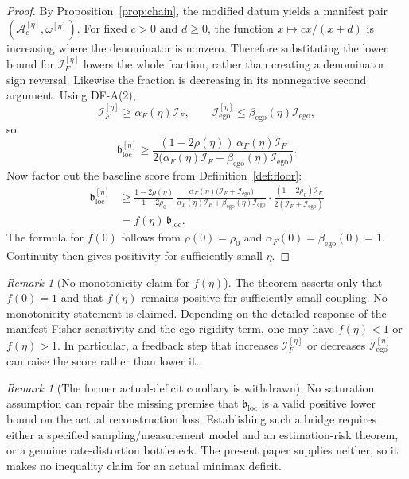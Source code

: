 \documentclass[12pt]{article}
\theoremstyle{definition}
\theoremstyle{remark}
\newtheorem{remark}[theorem]{Remark}
\begin{document}
\begin{proof}
By Proposition~\ref{prop:chain}, the modified datum yields a manifest
pair \((\mathcal A_c^{[\eta]},\omega^{[\eta]})\). For fixed
\(c>0\) and \(d\ge0\), the function \(x\mapsto cx/(x+d)\) is increasing
where the denominator is nonzero. Therefore
substituting the lower bound for \(\mathcal I_F^{[\eta]}\) lowers the
whole fraction, rather than creating a denominator sign reversal.
Likewise the fraction is decreasing in its nonnegative second argument.
Using DF-A(2),
\[
\mathcal I_F^{[\eta]}
\ge
\alpha_F(\eta)\mathcal I_F,
\qquad
\mathcal I_{\mathrm{ego}}^{[\eta]}
\le
\beta_{\mathrm{ego}}(\eta)\mathcal I_{\mathrm{ego}},
\]
so
\[
\mathfrak b_{\mathrm{loc}}^{[\eta]}
\ge
\frac{(1-2\rho(\eta))\,\alpha_F(\eta)\mathcal I_F}
{2\bigl(\alpha_F(\eta)\mathcal I_F
+\beta_{\mathrm{ego}}(\eta)\mathcal I_{\mathrm{ego}}\bigr)}.
\]
Now factor out the baseline score from
Definition~\ref{def:floor}:
\begin{align*}
\mathfrak b_{\mathrm{loc}}^{[\eta]}
&\ge
\frac{1-2\rho(\eta)}{1-2\rho_0}\,
\frac{\alpha_F(\eta)
\bigl(\mathcal I_F+\mathcal I_{\mathrm{ego}}\bigr)}
{\alpha_F(\eta)\mathcal I_F
+\beta_{\mathrm{ego}}(\eta)\mathcal I_{\mathrm{ego}}}
\cdot
\frac{(1-2\rho_0)\mathcal I_F}
{2(\mathcal I_F+\mathcal I_{\mathrm{ego}})} \\
&=
f(\eta)\,
\mathfrak b_{\mathrm{loc}}.
\end{align*}
The formula for \(f(0)\) follows from
\(\rho(0)=\rho_0\) and \(\alpha_F(0)=\beta_{\mathrm{ego}}(0)=1\).
Continuity then gives positivity for sufficiently small \(\eta\).
\end{proof}

\begin{remark}[No monotonicity claim for \(f(\eta)\)]
The theorem asserts only that \(f(0)=1\) and that \(f(\eta)\) remains
positive for sufficiently small coupling. No monotonicity statement is
claimed. Depending on the detailed response of the manifest Fisher
sensitivity and the ego-rigidity term, one may have \(f(\eta)<1\) or
\(f(\eta)>1\). In particular, a feedback step that increases
\(\mathcal I_F^{[\eta]}\) or decreases
\(\mathcal I_{\mathrm{ego}}^{[\eta]}\) can raise the score rather than
lower it.
\end{remark}

\begin{remark}[The former actual-deficit corollary is withdrawn]
No saturation assumption can repair the missing premise that
\(\mathfrak b_{\mathrm{loc}}\) is a valid positive lower bound on the
actual reconstruction loss. Establishing such a bridge requires either
a specified sampling/measurement model and an estimation-risk theorem,
or a genuine rate-distortion bottleneck. The present paper supplies
neither, so it makes no inequality claim for an actual minimax deficit.
\end{remark}
\end{document}
